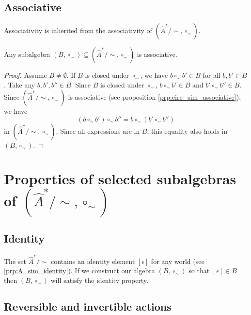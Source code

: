 \subsection{Associative}
Associativity is inherited from the associativity of $(\hat{A}^{*}/\sim, \circ_{\sim})$.
\begin{proposition}\label{prp:any_subalgebra_associative}
    Any subalgebra $(B, \circ_{\sim}) \subseteq (\hat{A}^{*}/\sim, \circ_{\sim})$ is associative.
\end{proposition}
\begin{proof}
    Assume $B \neq \emptyset$.
    If $B$ is closed under $\circ_{\sim}$, we have $b \circ_{\sim} b' \in B$ for all $b,b' \in B$.
    Take any $b, b', b'' \in B$.
    Since $B$ is closed under $\circ_{\sim}$, $b \circ_{\sim} b' \in B$ and $b' \circ_{\sim} b'' \in B$.
    Since $(\hat{A}^{*}/\sim, \circ_{\sim})$ is associative (see proposition \ref{prp:circ_sim_associative}), we have
    \begin{equation}
        (b \circ_{\sim} b') \circ_{\sim} b'' = b \circ_{\sim} (b' \circ_{\sim} b'')
    \end{equation}
    in $(\hat{A}^{*}/\sim, \circ_{\sim})$.
    Since all expressions are in $B$, this equality also holds in $(B, \circ_{\sim})$.
\end{proof}

\section{
Properties of selected subalgebras \texorpdfstring{of $(\hat{A}^{*}/\sim, \circ_{\sim})$}{}
}

\subsection{Identity}
The set $\hat{A}^{*}/\sim$ contains an identity element $[\epsilon]$ for any world (see \cref{prp:A_sim_identity}).
If we construct our algebra $(B, \circ_{\sim})$ so that $[\epsilon] \in B$ then $(B, \circ_{\sim})$ will satisfy the identity property.


\subsection{Reversible and invertible actions}

